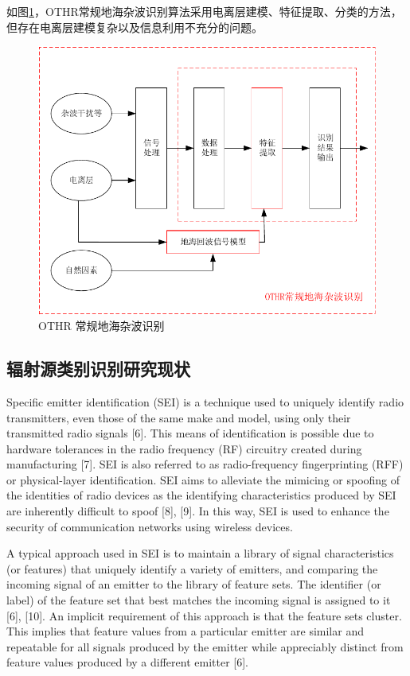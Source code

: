 如图\ref{fig:othr_tradition}，OTHR常规地海杂波识别算法采用电离层建模、特征提取、分类的方法，但存在电离层建模复杂以及信息利用不充分的问题。
\begin{figure}[H]
	\centering
	\includegraphics[width=\textwidth]{figures/othr_tradition}
	\caption{OTHR 常规地海杂波识别}
	\label{fig:othr_tradition}
\end{figure}


\subsection{辐射源类别识别研究现状}
Specific emitter identification (SEI) is a technique used to uniquely identify radio transmitters, even those of the same make and model, using only their transmitted radio signals [6]. This means of identification is possible due to hardware tolerances in the radio frequency (RF) circuitry created during manufacturing [7]. SEI is also referred to as radio-frequency fingerprinting (RFF) or physical-layer identification. SEI aims to alleviate the mimicing or spoofing of the identities of radio devices as the identifying characteristics produced by SEI are inherently difficult to spoof [8], [9]. In this way, SEI is used to enhance the security of communication networks using wireless devices.

A typical approach used in SEI is to maintain a library of signal characteristics (or features) that uniquely identify a variety of emitters, and comparing the incoming signal of an emitter to the library of feature sets. The identifier (or label) of the feature set that best matches the incoming signal is assigned to it [6], [10]. An implicit requirement of this approach is that the feature sets cluster. This implies that feature values from a particular emitter are similar and repeatable for all signals produced by the emitter while appreciably distinct from feature values produced by a different emitter [6].

